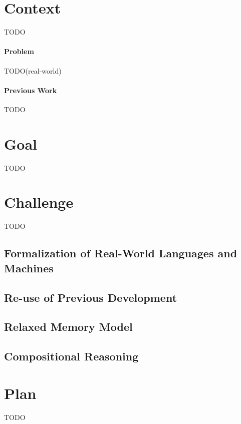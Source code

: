 \documentclass[nocopyrightspace]{sigplanconf}
\begin{document}
\section{Context}
TODO

\paragraph{Problem}
TODO(real-world)

\paragraph{Previous Work}
TODO

\section{Goal}
TODO

\section{Challenge}
TODO

\subsection{Formalization of Real-World Languages and Machines}
\subsection{Re-use of Previous Development}
\subsection{Relaxed Memory Model}
\subsection{Compositional Reasoning}

\section{Plan}
TODO






\end{document}
